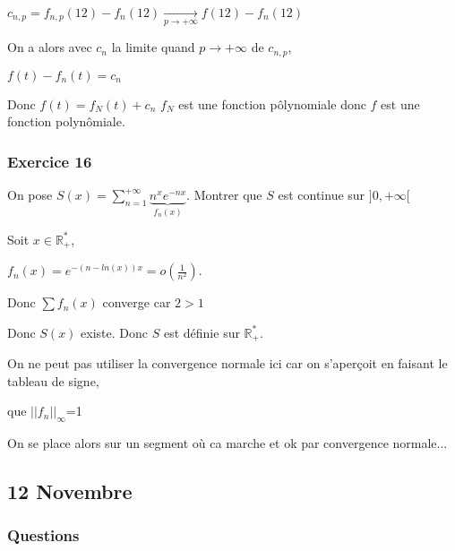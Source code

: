 \documentclass[a4paper, 11pt, hidelinks]{article}
\begin{document}
$c_{n,p}= f_{n,p}(12)-f_n(12) \underset{p \to + \infty}{\longrightarrow} f(12) - f_n(12)$

On a alors avec $c_n$ la limite quand $p \to +\infty$ de $c_{n,p}$,

$f(t)-f_n(t)=c_n$

Donc $f(t)=f_N(t)+c_n$ $f_N$ est une fonction pôlynomiale donc $f$ est une fonction polynômiale.




\subsubsection{Exercice 16}

On pose $S(x)=\displaystyle\sum_{n=1}^{+\infty} \underbrace{n^xe^{-nx}}_{f_n(x)}$. Montrer que $S$ est continue sur $]0,+\infty [$

Soit $x \in \mathbb{R}^*_+$,

$f_n(x)=e^{-(n-ln(x))x}= o(\frac{1}{n^2})$.

Donc $\sum f_n(x)$ converge car $2>1$

Donc $S(x)$ existe. Donc $S$ est définie sur $\mathbb{R}^*_+$.

On ne peut pas utiliser la convergence normale ici car on s'aperçoit en faisant le tableau de signe,

que $||f_n||_{\infty}$=1

On se place alors sur un segment où ca marche et ok par convergence normale... 



\subsection{12 Novembre}


\subsubsection{Questions}
\end{document}
